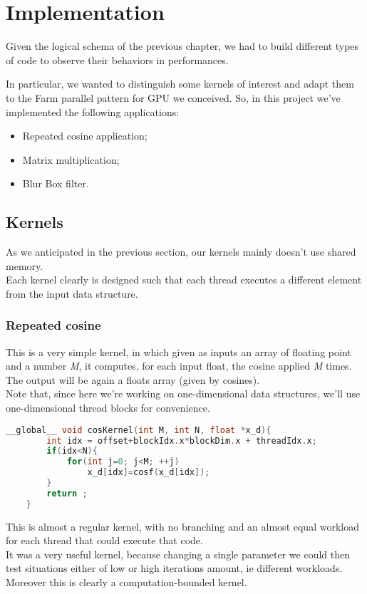 \chapter{Implementation} 
\label{chap:impl}
Given the logical schema of the previous chapter, we had to build different types of code to observe their behaviors in performances.

In particular, we wanted to distinguish some kernels of interest and adapt them to the Farm parallel pattern for GPU we conceived. So, in this project we've implemented the following applications:
\begin{itemize}
	\item Repeated cosine application;
	\item Matrix multiplication;
	\item Blur Box filter.
\end{itemize}

\section{Kernels}
As we anticipated in the previous section, our kernels mainly doesn't use shared memory.\\
Each kernel clearly is designed such that each thread executes a different element from the input data structure.
\subsection{Repeated cosine}
	This is a very simple kernel, in which given as inputs an array of floating point and a number \textit{M}, it computes, for each input float, the cosine applied \textit{M} times. The output will be again a floats array (given by cosines).\\
	Note that, since here we're working on one-dimensional data structures, we'll use one-dimensional thread blocks for convenience.
	\begin{lstlisting}[language=C++]
	__global__ void cosKernel(int M, int N, float *x_d){  		  
		int idx = offset+blockIdx.x*blockDim.x + threadIdx.x; 		
		if(idx<N){		
			for(int j=0; j<M; ++j)
				x_d[idx]=cosf(x_d[idx]);  		
		}
		return ;
	}
	\end{lstlisting}
	This is almost a regular kernel, with no branching and an almost equal workload for each thread that could execute that code.\\
	It was a very useful kernel, because changing a single parameter we could then test situations either of low or high iterations amount, ie different workloads.
	Moreover this is clearly a computation-bounded kernel.
	
